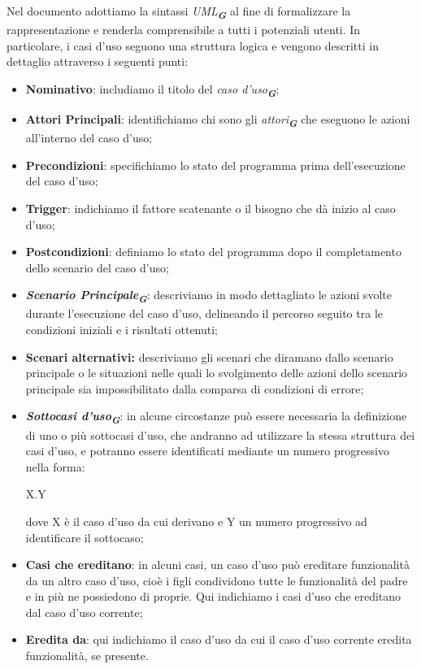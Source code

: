 Nel documento adottiamo la sintassi \emph{UML}\textsubscript{\textit{\textbf{G}}} al fine di formalizzare la rappresentazione e
renderla comprensibile a tutti i potenziali utenti. In particolare, i casi d'uso seguono una
struttura logica e vengono descritti in dettaglio attraverso i seguenti punti:
\begin{itemize}
    \item \textbf{Nominativo}: includiamo il titolo del \emph{caso d'uso}\textsubscript{\textit{\textbf{G}}};
    \item \textbf{Attori Principali}: identifichiamo chi sono gli \emph{attori}\textsubscript{\textit{\textbf{G}}} che eseguono le azioni all'interno 
                del caso d'uso;
    \item \textbf{Precondizioni}: specifichiamo lo stato del programma prima dell'esecuzione del caso d'uso;
    \item \textbf{Trigger}: indichiamo il fattore scatenante o il bisogno che dà inizio al caso d'uso;
    \item \textbf{Postcondizioni}: definiamo lo stato del programma dopo il completamento dello scenario del caso d'uso;
    \item \textbf{\emph{Scenario Principale}\textsubscript{\textit{\textbf{G}}}}: descriviamo in modo dettagliato le azioni svolte durante
                l'esecuzione del caso d'uso, delineando il percorso seguito tra le condizioni iniziali e i risultati ottenuti;
    \item \textbf{Scenari alternativi:} descriviamo gli scenari che diramano dallo scenario principale o le situazioni nelle quali lo svolgimento delle 
                azioni dello scenario principale sia impossibilitato dalla comparsa di condizioni di errore;
    \item \textbf{\emph{Sottocasi d'uso}\textsubscript{\textit{\textbf{G}}}}: in alcune circostanze può essere necessaria la definizione di uno
                o più sottocasi d'uso, che andranno ad utilizzare la stessa struttura dei casi d'uso, e potranno essere 
                identificati mediante un numero progressivo nella forma:
                \begin{center}
                    X.Y
                \end{center}
                dove X è il caso d'uso da cui derivano e Y un numero progressivo ad identificare il sottocaso;
    \item \textbf{Casi che ereditano}: in alcuni casi, un caso d'uso può ereditare funzionalità da un altro caso d'uso, cioè
                i figli condividono tutte le funzionalità del padre e in più ne possiedono di proprie. Qui 
                indichiamo i casi d'uso che ereditano dal caso d'uso corrente;
    \item \textbf{Eredita da}: qui indichiamo il caso d'uso da cui il caso d'uso corrente eredita funzionalità, se presente.
\end{itemize}

